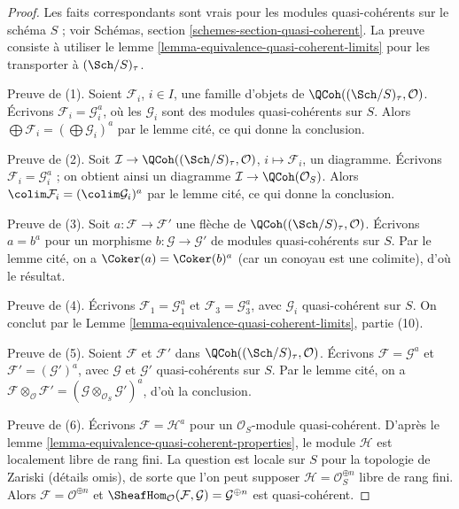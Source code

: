 \begin{proof}
Les faits correspondants sont vrais pour les modules quasi-cohérents sur le
schéma $S$ ; voir Schémas, section
\ref{schemes-section-quasi-coherent}. La preuve consiste à utiliser le
lemme \ref{lemma-equivalence-quasi-coherent-limits} pour les transporter à
$(\Sch/S)_\tau$.

\medskip\noindent
Preuve de (1). Soient $\mathcal{F}_i$, $i \in I$, une famille d'objets de
$\QCoh((\Sch/S)_\tau, \mathcal{O})$. Écrivons
$\mathcal{F}_i = \mathcal{G}_i^a$, où les $\mathcal{G}_i$ sont des modules
quasi-cohérents sur $S$. Alors
$\bigoplus \mathcal{F}_i = (\bigoplus \mathcal{G}_i)^a$ par le lemme cité,
ce qui donne la conclusion.

\medskip\noindent
Preuve de (2). Soit
$\mathcal{I} \to \QCoh((\Sch/S)_\tau, \mathcal{O})$,
$i \mapsto \mathcal{F}_i$, un diagramme. Écrivons
$\mathcal{F}_i = \mathcal{G}_i^a$ ; on obtient ainsi un diagramme
$\mathcal{I} \to \QCoh(\mathcal{O}_S)$. Alors
$\colim \mathcal{F}_i = (\colim \mathcal{G}_i)^a$ par le lemme cité,
ce qui donne la conclusion.

\medskip\noindent
Preuve de (3). Soit $a : \mathcal{F} \to \mathcal{F}'$ une flèche de
$\QCoh((\Sch/S)_\tau, \mathcal{O})$. Écrivons $a = b^a$ pour un morphisme
$b : \mathcal{G} \to \mathcal{G}'$ de modules quasi-cohérents sur $S$.
Par le lemme cité, on a $\Coker(a) = \Coker(b)^a$ (car un conoyau est une
colimite), d'où le résultat.

\medskip\noindent
Preuve de (4). Écrivons $\mathcal{F}_1 = \mathcal{G}_1^a$ et
$\mathcal{F}_3 = \mathcal{G}_3^a$, avec $\mathcal{G}_i$ quasi-cohérent sur
$S$. On conclut par le Lemme
\ref{lemma-equivalence-quasi-coherent-limits}, partie (10).

\medskip\noindent
Preuve de (5). Soient $\mathcal{F}$ et $\mathcal{F}'$ dans
$\QCoh((\Sch/S)_\tau, \mathcal{O})$. Écrivons
$\mathcal{F} = \mathcal{G}^a$ et
$\mathcal{F}' = (\mathcal{G}')^a$, avec $\mathcal{G}$ et $\mathcal{G}'$
quasi-cohérents sur $S$. Par le lemme cité, on a
$\mathcal{F} \otimes_\mathcal{O} \mathcal{F}' =
(\mathcal{G} \otimes_{\mathcal{O}_S} \mathcal{G}')^a$,
d'où la conclusion.

\medskip\noindent
Preuve de (6). Écrivons $\mathcal{F} = \mathcal{H}^a$ pour un
$\mathcal{O}_S$-module quasi-cohérent. D'après le
lemme \ref{lemma-equivalence-quasi-coherent-properties}, le module
$\mathcal{H}$ est localement libre de rang fini. La question est locale sur
$S$ pour la topologie de Zariski (détails omis), de sorte que l'on peut
supposer $\mathcal{H} = \mathcal{O}_S^{\oplus n}$ libre de rang fini.
Alors $\mathcal{F} = \mathcal{O}^{\oplus n}$ et
$\SheafHom_\mathcal{O}(\mathcal{F}, \mathcal{G}) = \mathcal{G}^{\oplus n}$
est quasi-cohérent.
\end{proof}


